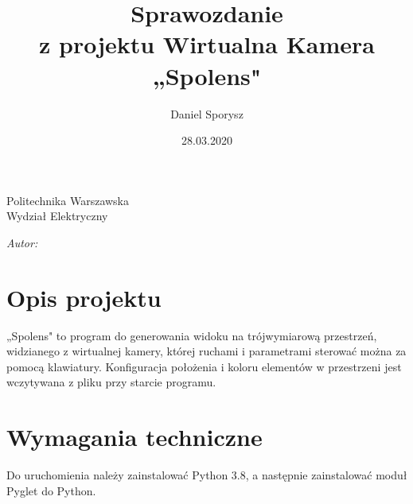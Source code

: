 \documentclass[12pt]{article}
\title{Sprawozdanie\\z projektu Wirtualna Kamera\\„Spolens"}
\author{Daniel Sporysz}
\date{28.03.2020}
\begin{document}
\makeatletter
\newcommand{\linia}{\rule{\linewidth}{0.4mm}}
\renewcommand{\maketitle}{\begin{titlepage}
    \begin{center}\LARGE
    Politechnika Warszawska\\Wydział Elektryczny
    \end{center}
    \vspace{4cm}
    \noindent
    \begin{center}
      \LARGE \textsc{\@title}
         \end{center}
    \vspace{4cm}
    \begin{flushright}
    \begin{minipage}{5cm}
    \textit{Autor:}\\
    \normalsize \textsc{\@author} \par
    \end{minipage}
     \end{flushright}
    \vspace*{\stretch{6}}
    \begin{center}
    \vspace*{\fill}
    \@date
    \end{center}
  \end{titlepage}%
}
\makeatother

\maketitle
\newpage

\tableofcontents
\newpage

\section{Opis projektu}
„Spolens" to program do generowania widoku na trójwymiarową przestrzeń, widzianego z wirtualnej kamery, której ruchami i parametrami sterować można za pomocą klawiatury.
Konfiguracja położenia i koloru elementów w przestrzeni jest wczytywana z pliku przy starcie programu.

\section{Wymagania techniczne}
Do uruchomienia należy zainstalować Python 3.8, a następnie zainstalować moduł Pyglet do Python.
\end{document}
